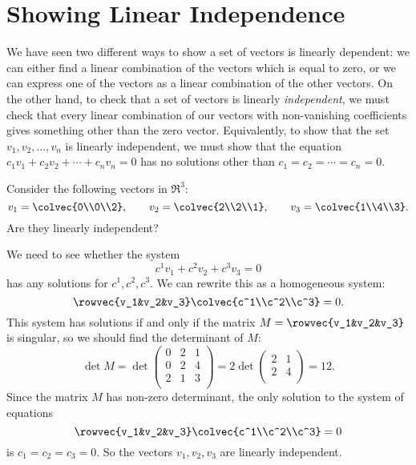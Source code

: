 \section{Showing Linear Independence} 
We have seen two different ways to show a set of vectors is linearly dependent: we can either find a linear combination of the vectors which is equal to zero, or we can express one of the vectors as a linear combination of the other vectors. On the other hand, to check that a set of vectors is linearly {\it independent}, we must check that every  linear combination of our vectors with non-vanishing coefficients gives something other than the zero vector. Equivalently, to show that the set \(v_1, v_2, \ldots, v_n\) is linearly independent, we must show that the equation \(c_1 v_1+c_2v_2 + \cdots + c_n v_n=0\) has no solutions other than \(c_1=c_2=\cdots=c_n=0.\)

\begin{example}
Consider the following vectors in $\Re^3$:
\[
v_1=\colvec{0\\0\\2},
\qquad v_2=\colvec{2\\2\\1},
\qquad v_3=\colvec{1\\4\\3}.
\]
Are they linearly independent?

We need to see whether the system
\[
c^1v_1 + c^2v_2+ c^3v_3=0
\]
has any solutions for $c^1, c^2, c^3$.  We can rewrite this as a homogeneous system:
\[
\rowvec{v_1&v_2&v_3}\colvec{c^1\\c^2\\c^3}=0.
\]
This system has solutions if and only if the matrix $M=\rowvec{v_1&v_2&v_3}$ is singular, so we should find the determinant of $M$:
\[
\det M = \det \begin{pmatrix}
0 & 2 & 1 \\
0 & 2 & 4 \\
2 & 1 & 3 \\
\end{pmatrix}
= 2 \det \begin{pmatrix}
2 & 1 \\
2 & 4 \\
\end{pmatrix}
=12.
\]
Since the matrix \(M\) has non-zero determinant, the only solution to the system of equations
\[
\rowvec{v_1&v_2&v_3}\colvec{c^1\\c^2\\c^3}=0
\]
is \(c_1=c_2=c_3=0\). So the vectors \(v_1, v_2, v_3\) are linearly independent.
\end{example}

